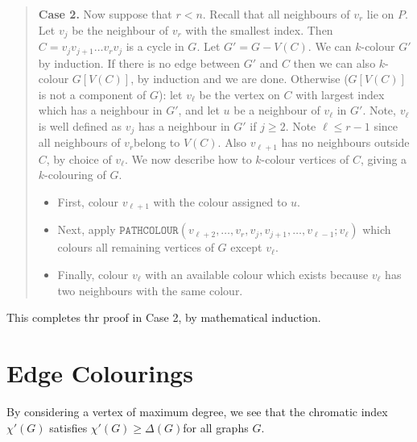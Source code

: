 \begin{theorem}[Brooks, 1941]
{\begin{quote}
            {\bf Case 2.} Now suppose that \(r < n\). Recall that all neighbours of \(v_r\) lie on \(P\). Let \(v_j\) be the neighbour of \(v_r\) with the smallest index. Then \(C = v_jv_{j + 1} \dots v_rv_j\) is a cycle in \(G\). Let \(G' = G - V(C)\). We can \(k\)-colour \(G'\) by induction. If there is no edge between \(G'\) and \(C\) then we can also \(k\)-colour \(G[V(C)]\), by induction and we are done. Otherwise (\(G[V(C)]\) is not a component of \(G\)): let \(v_\ell\) be the vertex on \(C\) with largest index which has a neighbour in \(G'\), and let \(u\) be a neighbour of \(v_\ell\) in \(G'\). Note, \(v_\ell\) is well defined as \(v_j\) has a neighbour in \(G'\) if \(j \geq 2\). Note \(\ell \leq r - 1\) since all neighbours of \(v_r\)belong to \(V(C)\). Also \(v_{\ell + 1}\) has no neighbours outside \(C\), by choice of \(v_\ell\). We now describe how to \(k\)-colour vertices of \(C\), giving a \(k\)-colouring of \(G\).
            \begin{itemize}
                \item First, colour \(v_{\ell + 1}\) with the colour assigned to \(u\).
                \item Next, apply \(\texttt{PATHCOLOUR}(v_{\ell + 2}, \dots, v_r, v_j, v_{j + 1}, \dots, v_{\ell - 1}; v_\ell)\) which colours all remaining vertices of \(G\) except \(v_\ell\).
                \item Finally, colour \(v_\ell\) with an available colour which exists because \(v_\ell\) has two neighbours with the same colour.
            \end{itemize}
        \end{quote}
        This completes thr proof in Case 2, by mathematical induction.
    }
\end{theorem}

\section{Edge Colourings}
By considering a vertex of maximum degree, we see that the chromatic index \(\chi'(G)\) satisfies \(\chi'(G) \geq \Delta(G)\)for all graphs \(G\).

